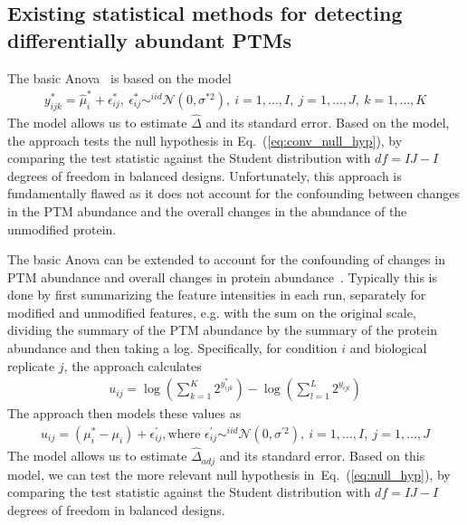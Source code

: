\documentclass[mcp]{article}
\numberwithin{table}{section}
\def\eqref#1{Eq.~(\ref{eq:#1})}
\begin{document}
\subsection*{Existing statistical methods for detecting differentially abundant PTMs}


\medskip \noindent 

The basic Anova~\cite{kutner_etal_04a} is based on the model
\begin{eqnarray}
y^*_{ijk} = \hat{\mu}^{*}_{i} + \epsilon^{\ast}_{ij}, \ \epsilon^{\ast}_{ij} \mathop\sim^{iid} \mathcal{N}(0, \sigma^{*2}),\ i=1,\ldots,I,\ j=1,\ldots,J,\ k=1,\ldots,K
\label{eq:ttest_model}
\end{eqnarray}
The model allows us to estimate $\hat{\Delta}$ and its standard error.
Based on the model, the approach tests the null hypothesis in \eqref{conv_null_hyp}, by comparing the test statistic against the Student distribution with $df=IJ-I$ degrees of freedom in balanced designs.
Unfortunately, this approach is fundamentally flawed as it does not account for the confounding between changes in the PTM abundance and the overall changes in the abundance of the unmodified protein.

\medskip \noindent 


\medskip \noindent 
The basic Anova can be extended to account for the confounding of changes in PTM abundance and overall changes in protein abundance~\cite{Schwammle2015,THOMAS2020,Mertins:2013}. Typically this is done by first summarizing the feature intensities in each run, separately for modified and unmodified features, e.g. with the sum on the original scale, dividing the summary of the PTM abundance by the summary of the protein abundance and then taking a log. Specifically, for condition $i$ and biological replicate $j$, the approach calculates
\begin{eqnarray}
u_{ij} = \log \left( \sum_{k=1}^{K} 2^{y_{ijk}^{\ast}} \right) - \log \left( \sum_{l=1}^{L} 2^{y_{ijl}} \right)
\label{eq:adj_estimation}
\end{eqnarray}
The approach then models these values as
\begin{eqnarray}
u_{ij} = (\mu^{\ast}_{i}-\mu_i) + \epsilon^{\prime}_{ij}, \text{where } \epsilon^{\prime}_{ij} \mathop\sim^{iid} \mathcal{N}(0, \sigma^{\prime 2}),\ i=1,\ldots,I,\ j=1,\ldots,J
\label{eq:ttest_model}
\end{eqnarray}
The model allows us to estimate $\hat{\Delta}_{adj}$ and its standard error.
Based on this model, we can test the more relevant null hypothesis in~\eqref{null_hyp}, by comparing the test statistic against the Student distribution with $df=IJ-I$ degrees of freedom in balanced designs.
\end{document}
